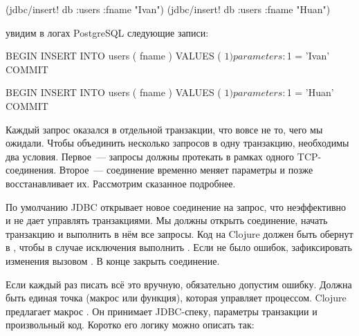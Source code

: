\begin{english}
  \begin{clojure}
(jdbc/insert! db :users {:fname "Ivan"})
(jdbc/insert! db :users {:fname "Huan"})
  \end{clojure}
\end{english}

\noindent
увидим в логах PostgreSQL следующие записи:

\begin{english}
  \begin{sql}
BEGIN
INSERT INTO users ( fname ) VALUES ( $1 )
parameters: $1 = 'Ivan'
COMMIT

BEGIN
INSERT INTO users ( fname ) VALUES ( $1 )
parameters: $1 = 'Huan'
COMMIT
  \end{sql}
\end{english}

Каждый запрос оказался в отдельной транзакции, что вовсе не то, чего мы ожидали. Чтобы объединить несколько запросов в одну транзакцию, необходимы два условия. Первое~--- запросы должны протекать в рамках одного TCP-соединения. Второе~--- соединение временно меняет параметры и позже восстанавливает их. Рассмотрим сказанное подробнее.

По умолчанию JDBC открывает новое соединение на запрос, что неэффективно и не дает управлять транзакциями. Мы должны открыть соединение, начать транзакцию и выполнить в нём все запросы. Код на Clojure должен быть обернут в , чтобы в случае исключения выполнить . Если не было ошибок, зафиксировать изменения вызовом . В конце закрыть соединение.

Если каждый раз писать всё это вручную, обязательно допустим ошибку. Должна быть единая точка (макрос или функция), которая управляет процессом. Clojure предлагает макрос . Он принимает JDBC-спеку, параметры транзакции и произвольный код. Коротко его логику можно описать так:


